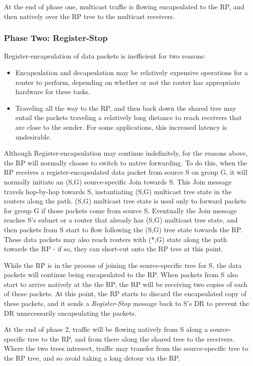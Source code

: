 At the end of phase one, multicast traffic is flowing encapsulated to
the RP, and then natively over the RP tree to the multicast receivers.

\subsubsection*{Phase Two: Register-Stop}

Register-encapsulation of data packets is inefficient for two reasons:
\begin{itemize}
\item Encapsulation and decapsulation may be relatively expensive
operations for a router to perform, depending on whether or not the
router has appropriate hardware for these tasks.

\item Traveling all the way to the RP, and then back down the shared
tree may entail the packets traveling a relatively long distance to
reach receivers that are close to the sender.  For some applications,
this increased latency is undesirable.
\end{itemize}
Although Register-encapsulation may continue indefinitely, for the
reasons above, the RP will normally choose to switch to native forwarding.
To do this, when the RP receives a register-encapsulated data packet
from source S on group G, it will normally initiate an (S,G)
source-specific Join towards S.  This Join message travels hop-by-hop
towards S, instantiating (S,G) multicast tree state in the routers
along the path.  (S,G) multicast tree state is used only to forward
packets for group G if those packets come from source S.  Eventually
the Join message reaches S's subnet or a router that already has (S,G)
multicast tree state, and then packets from S start to flow following
the (S,G) tree state towards the RP.  These data packets may also
reach routers with (*,G) state along the path towards the RP - if so,
they can short-cut onto the RP tree at this point.

While the RP is in the process of joining the source-specific tree for
S, the data packets will continue being encapsulated to the RP.
When packets from S also start to arrive natively at the the RP, the
RP will be receiving two copies of each of these packets.  At this
point, the RP starts to discard the encapsulated copy of these
packets, and it sends a {\it Register-Stop} message back to S's DR to
prevent the DR unnecessarily encapsulating the packets.

At the end of phase 2, traffic will be flowing natively from S along a
source-specific tree to the RP, and from there along the shared tree
to the receivers.  Where the two trees intersect, traffic may transfer
from the source-specific tree to the RP tree, and so avoid taking a
long detour via the RP.

